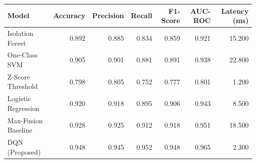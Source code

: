 \begin{tabular}{lrrrrrr}
\toprule
Model & Accuracy & Precision & Recall & F1-Score & AUC-ROC & Latency (ms) \\
\midrule
Isolation Forest & 0.892 & 0.885 & 0.834 & 0.859 & 0.921 & 15.200 \\
One-Class SVM & 0.905 & 0.901 & 0.881 & 0.891 & 0.938 & 22.800 \\
Z-Score Threshold & 0.798 & 0.805 & 0.752 & 0.777 & 0.801 & 1.200 \\
Logistic Regression & 0.920 & 0.918 & 0.895 & 0.906 & 0.943 & 8.500 \\
Max-Fusion Baseline & 0.928 & 0.925 & 0.912 & 0.918 & 0.951 & 18.500 \\
DQN (Proposed) & 0.948 & 0.945 & 0.952 & 0.948 & 0.965 & 2.300 \\
\bottomrule
\end{tabular}
